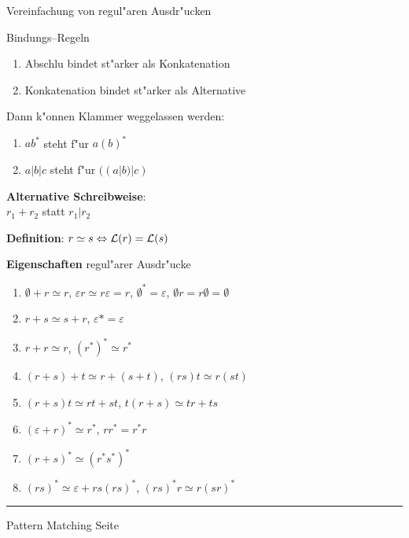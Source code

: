 
\begin{slide}{}
\normalsize

\begin{center}
Vereinfachung von regul"aren Ausdr"ucken
\end{center}
\vspace*{0.5cm}

\footnotesize

Bindungs--Regeln 
\begin{enumerate}
\item Abschlu\3 bindet st"arker als Konkatenation
\item Konkatenation bindet st"arker als Alternative
\end{enumerate}
Dann k"onnen Klammer weggelassen werden:
\begin{enumerate}
\item $ab^*$ \quad steht f"ur \quad $a(b)^*$
\item $a|b|c$ \quad steht f"ur \quad $((a|b)|c)$
\end{enumerate}
\textbf{Alternative Schreibweise}: \\[0.3cm]
\hspace*{1.3cm} $r_1 + r_2$ statt $r_1 | r_2$

\textbf{Definition}: $r \simeq s \Leftrightarrow {\cal L}(r) = {\cal L}(s)$

\textbf{Eigenschaften} regul"arer Ausdr"ucke
\begin{enumerate}
\item $\emptyset + r \simeq r$, \quad $\varepsilon r \simeq r \varepsilon = r$, \quad $\emptyset^* = \varepsilon$, \quad $\emptyset r = r\emptyset = \emptyset$
\item $r + s \simeq s + r$, \quad $\varepsilon* = \varepsilon$
\item $r + r \simeq r$, \quad $(r^*)^* \simeq r^*$
\item $(r + s) + t \simeq r + (s + t)$, \quad $(rs)t \simeq r(st)$
\item $(r+s)t \simeq rt + st$, \quad  $t(r+s) \simeq tr + ts$
\item $(\varepsilon + r)^* \simeq r^*$, \quad $rr^* = r^*r$
\item $(r + s)^* \simeq (r^*s^*)^*$
\item $(rs)^* \simeq \varepsilon + rs(rs)^*$, \quad $(rs)^*r \simeq r(sr)^*$
\end{enumerate}

\vspace*{\fill}
\tiny \addtocounter{mypage}{1}
\rule{17cm}{1mm}
Pattern Matching \hspace*{\fill} Seite 
\end{slide}

